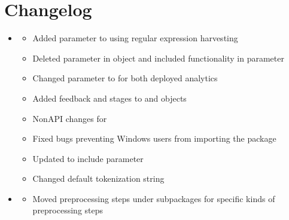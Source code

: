 \documentclass[letterpaper,10pt,english]{sphinxmanual}
\begin{document}
\chapter{Changelog}
\label{\detokenize{index:changelog}}\begin{itemize}
\item {} \begin{description}
\begin{itemize}
\item {} 
\sphinxAtStartPar
Added  parameter to  using regular expression harvesting

\item {} 
\sphinxAtStartPar
Deleted  parameter in  object and included functionality in  parameter

\item {} 
\sphinxAtStartPar
Changed  parameter to  for both deployed analytics

\item {} 
\sphinxAtStartPar
Added feedback and stages to  and  objects

\item {} 
\sphinxAtStartPar
Non\sphinxhyphen{}API changes for 

\item {} 
\sphinxAtStartPar
Fixed bugs preventing Windows users from importing the package

\item {} 
\sphinxAtStartPar
Updated  to include  parameter

\item {} 
\sphinxAtStartPar
Changed default tokenization string

\end{itemize}

\end{description}

\item {} \begin{description}
\begin{itemize}
\item {} 
\sphinxAtStartPar
Moved preprocessing steps under subpackages for specific kinds of preprocessing steps


\end{itemize}
\end{description}
\end{itemize}
\end{document}
